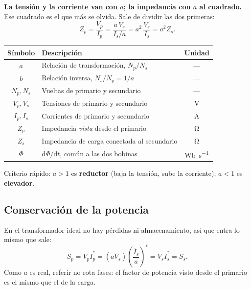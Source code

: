 \documentclass[11pt,a4paper]{article}
\begin{document}
\noindent \textbf{La tensión y la corriente van con $a$; la impedancia con $a$ al
cuadrado.} Ese cuadrado es el que más se olvida. Sale de dividir las dos primeras:
\begin{equation}
  Z_p = \frac{V_p}{I_p} = \frac{a\,V_s}{I_s/a} = a^2\,\frac{V_s}{I_s} = a^2 Z_s .
\end{equation}

\begin{table}[h]
\centering
\begin{tabular}{@{}cL{7.2cm}c@{}}
\toprule
\textbf{Símbolo} & \textbf{Descripción} & \textbf{Unidad} \\
\midrule
$a$      & Relación de transformación, $N_p/N_s$ & --- \\
$b$      & Relación inversa, $N_s/N_p = 1/a$ & --- \\
$N_p,N_s$& Vueltas de primario y secundario & --- \\
$V_p,V_s$& Tensiones de primario y secundario & \unit{\volt} \\
$I_p,I_s$& Corrientes de primario y secundario & \unit{\ampere} \\
$Z_p$    & Impedancia \emph{vista} desde el primario & \unit{\ohm} \\
$Z_s$    & Impedancia de carga conectada al secundario & \unit{\ohm} \\
$\dot{\Phi}$ & $\mathrm{d}\Phi/\mathrm{d}t$, común a las dos bobinas & \unit{\weber\per\second} \\
\bottomrule
\end{tabular}
\end{table}

\noindent Criterio rápido: $a > 1$ es \textbf{reductor} (baja la tensión, sube la
corriente); $a < 1$ es \textbf{elevador}.

\subsection{Conservación de la potencia}

En el transformador ideal no hay pérdidas ni almacenamiento, así que entra lo mismo que sale:
\begin{equation}
  \bar{S}_p = \bar{V}_p \bar{I}_p^{*}
            = (a\bar{V}_s)\left(\frac{\bar{I}_s}{a}\right)^{\!*}
            = \bar{V}_s \bar{I}_s^{*} = \bar{S}_s .
\end{equation}
Como $a$ es real, referir no rota fases: el factor de potencia visto desde el primario es
el mismo que el de la carga.
\end{document}
